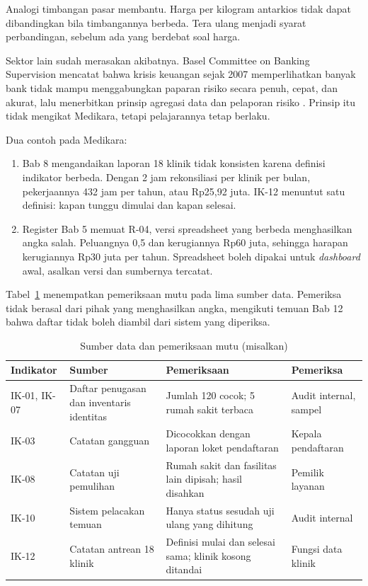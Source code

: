 Analogi timbangan pasar membantu. Harga per kilogram antarkios tidak dapat dibandingkan bila
timbangannya berbeda. Tera ulang menjadi syarat perbandingan, sebelum ada yang berdebat soal harga.

Sektor lain sudah merasakan akibatnya. Basel Committee on Banking Supervision mencatat bahwa krisis
keuangan sejak 2007 memperlihatkan banyak bank tidak mampu menggabungkan paparan risiko secara
penuh, cepat, dan akurat, lalu menerbitkan prinsip agregasi data dan pelaporan risiko
\cite{c13-bcbs239}. Prinsip itu tidak mengikat Medikara, tetapi pelajarannya tetap berlaku.

Dua contoh pada Medikara:
\begin{enumerate}
  \item Bab 8 mengandaikan laporan 18 klinik tidak konsisten karena definisi indikator berbeda.
  Dengan 2 jam rekonsiliasi per klinik per bulan, pekerjaannya 432 jam per tahun, atau Rp25,92 juta.
  IK-12 menuntut satu definisi: kapan tunggu dimulai dan kapan selesai.
  \item Register Bab 5 memuat R-04, versi spreadsheet yang berbeda menghasilkan angka salah.
  Peluangnya 0,5 dan kerugiannya Rp60 juta, sehingga harapan kerugiannya Rp30 juta per tahun.
  Spreadsheet boleh dipakai untuk \textit{dashboard} awal, asalkan versi dan sumbernya tercatat.
\end{enumerate}

Tabel~\ref{tab:ch13-mutu} menempatkan pemeriksaan mutu pada lima sumber data. Pemeriksa tidak
berasal dari pihak yang menghasilkan angka, mengikuti temuan Bab 12 bahwa daftar tidak boleh diambil
dari sistem yang diperiksa.

\begin{table}[!htb]
  \centering\small
  \caption{Sumber data dan pemeriksaan mutu (misalkan)}\label{tab:ch13-mutu}
  \begin{tabularx}{\textwidth}{|>{\raggedright\arraybackslash}p{}|>{\raggedright\arraybackslash}X|>{\raggedright\arraybackslash}X|>{\raggedright\arraybackslash}p{}|}
    \hline
    \textbf{Indikator} & \textbf{Sumber} & \textbf{Pemeriksaan} & \textbf{Pemeriksa} \\ \hline
    IK-01, IK-07 & Daftar penugasan dan inventaris identitas & Jumlah 120 cocok; 5 rumah sakit
    terbaca & Audit internal, sampel \\ \hline
    IK-03 & Catatan gangguan & Dicocokkan dengan laporan loket pendaftaran & Kepala pendaftaran \\
    \hline
    IK-08 & Catatan uji pemulihan & Rumah sakit dan fasilitas lain dipisah; hasil disahkan & Pemilik
    layanan \\ \hline
    IK-10 & Sistem pelacakan temuan & Hanya status sesudah uji ulang yang dihitung & Audit internal
    \\ \hline
    IK-12 & Catatan antrean 18 klinik & Definisi mulai dan selesai sama; klinik kosong ditandai &
    Fungsi data klinik \\ \hline
  \end{tabularx}
\end{table}


